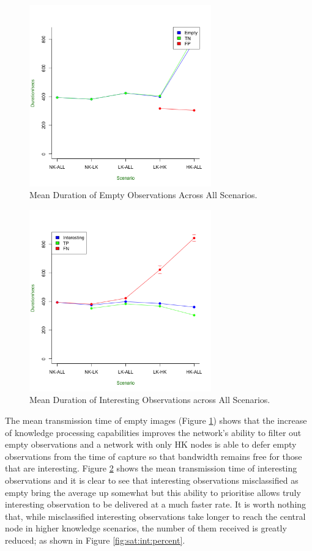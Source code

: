 	\begin{figure}[h]
	\centering
	\includegraphics[width=0.70\textwidth]{Chap7/figures/saturated/empty_dur}
	\caption{Mean Duration of Empty Observations Across All Scenarios.}
	\label{fig:sat:empty:dur}
	\end{figure}

	\begin{figure}[h]
	\centering
	\includegraphics[width=0.70\textwidth]{Chap7/figures/saturated/int_dur}
	\caption{Mean Duration of Interesting Observations across All Scenarios.}
	\label{fig:sat:int:dur}
	\end{figure}

The mean transmission time of empty images (Figure \ref{fig:sat:empty:dur}) shows that the increase of knowledge processing capabilities improves the network's ability to filter out empty observations and a network with only HK nodes is able to defer empty observations from the time of capture so that bandwidth remains free for those that are interesting. Figure \ref{fig:sat:int:dur} shows the mean transmission time of interesting observations and it is clear to see that interesting observations misclassified as empty bring the average up somewhat but this ability to prioritise allows truly interesting observation to be delivered at a much faster rate. It is worth nothing that, while misclassified interesting observations take longer to reach the central node in higher knowledge scenarios, the number of them received is greatly reduced; as shown in Figure \ref{fig:sat:int:percent}.

